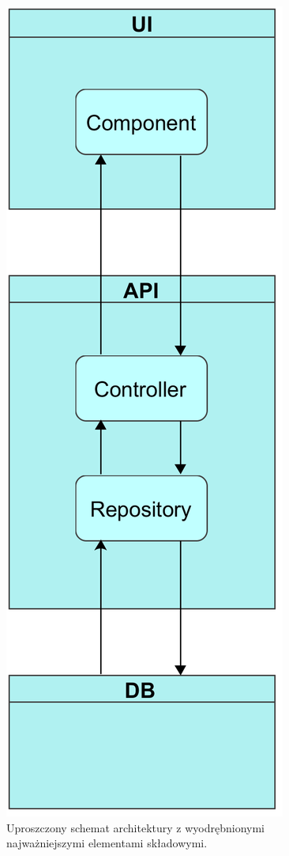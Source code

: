 \documentclass[eng,printmode,openany]{mgr}
\begin{document}
	\begin{figure}[H]
		\centering
		\includegraphics[scale=0.2]{images/architecture.png}
		\caption{Uproszczony schemat architektury z wyodrębnionymi najważniejszymi elementami składowymi.}
	\end{figure}
	
\end{document}
